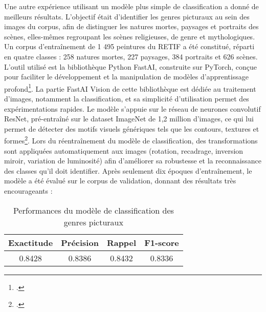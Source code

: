 Une autre expérience utilisant un modèle plus simple de classification a donné de meilleurs résultats. L’objectif était d’identifier les genres picturaux au sein des images du corpus, afin de distinguer les natures mortes, paysages et portraits des scènes, elles-mêmes regroupant les scènes religieuses, de genre et mythologiques. Un corpus d’entraînement de 1 495 peintures du RETIF a été constitué, réparti en quatre classes : 258 natures mortes, 227 paysages, 384 portraits et 626 scènes. L’outil utilisé est la bibliothèque Python FastAI, construite sur PyTorch, conçue pour faciliter le développement et la manipulation de modèles d’apprentissage profond\footcite{DocumentationFastAI}. La partie FastAI Vision de cette bibliothèque est dédiée au traitement d’images, notamment la classification, et sa simplicité d’utilisation permet des expérimentations rapides. Le modèle s’appuie sur le réseau de neurones convolutif ResNet, pré-entraîné sur le dataset ImageNet de 1,2 million d’images, ce qui lui permet de détecter des motifs visuels génériques tels que les contours, textures et formes\footcite{heDeepResidualLearning2015}. Lors du réentraînement du modèle de classification, des transformations sont appliquées automatiquement aux images (rotation, recadrage, inversion miroir, variation de luminosité) afin d’améliorer sa robustesse et la reconnaissance des classes qu’il doit identifier. Après seulement dix époques d’entraînement, le modèle a été évalué sur le corpus de validation, donnant des résultats très encourageants : 

\begin{table}[H]
\centering
\begin{tabular}{c c c c}
\hline
\textbf{Exactitude} & \textbf{Précision} & \textbf{Rappel} & \textbf{F1-score} \\
\hline
0.8428 & 0.8386 & 0.8432 & 0.8336 \\
\hline
\end{tabular}
\caption{Performances du modèle de classification des genres picturaux}
\label{tab:classification_genres_horizontal}
\end{table}

